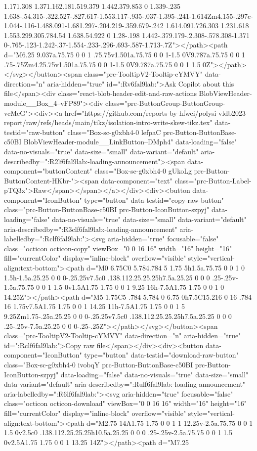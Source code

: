 {{{{{{{{{{{{{{{{{{{{{{{{{{{{{1.171.308 1.371.162.181.519.379 1.442.379.853 0 1.339-.235 1.638-.54.315-.322.527-.827.617-1.553.117-.935-.037-1.395-.241-1.614Zm4.155-.297c-1.044-.116-1.488.091-1.681.297-.204.219-.359.679-.242 1.614.091.726.303 1.231.618 1.553.299.305.784.54 1.638.54.922 0 1.28-.198 1.442-.379.179-.2.308-.578.308-1.371 0-.765-.123-1.242-.37-1.554-.233-.296-.693-.587-1.713-.7Z"></path><path d="M6.25 9.037a.75.75 0 0 1 .75.75v1.501a.75.75 0 0 1-1.5 0V9.787a.75.75 0 0 1 .75-.75Zm4.25.75v1.501a.75.75 0 0 1-1.5 0V9.787a.75.75 0 0 1 1.5 0Z"></path></svg></button><span class="prc-TooltipV2-Tooltip-cYMVY" data-direction="n" aria-hidden="true" id=":Rv6fal9lab:">Ask Copilot about this file</span><div class="react-blob-header-edit-and-raw-actions BlobViewHeader-module__Box_4--vFP89"><div class="prc-ButtonGroup-ButtonGroup-vcMeG"><div><a href="https://github.com/reports-by-hfwei/polysi-vldb2023-report/raw/refs/heads/main/tikz/isolation-intro-write-skew-tikz.tex" data-testid="raw-button" class="Box-sc-g0xbh4-0 lefpaC prc-Button-ButtonBase-c50BI BlobViewHeader-module__LinkButton--DMph4" data-loading="false" data-no-visuals="true" data-size="small" data-variant="default" aria-describedby=":R2lf6fal9lab:-loading-announcement"><span data-component="buttonContent" class="Box-sc-g0xbh4-0 gUkoLg prc-Button-ButtonContent-HKbr-"><span data-component="text" class="prc-Button-Label-pTQ3x">Raw</span></span></a></div><div><button data-component="IconButton" type="button" data-testid="copy-raw-button" class="prc-Button-ButtonBase-c50BI prc-Button-IconButton-szpyj" data-loading="false" data-no-visuals="true" data-size="small" data-variant="default" aria-describedby=":R3clf6fal9lab:-loading-announcement" aria-labelledby=":Rclf6fal9lab:"><svg aria-hidden="true" focusable="false" class="octicon octicon-copy" viewBox="0 0 16 16" width="16" height="16" fill="currentColor" display="inline-block" overflow="visible" style="vertical-align:text-bottom"><path d="M0 6.75C0 5.784.784 5 1.75 5h1.5a.75.75 0 0 1 0 1.5h-1.5a.25.25 0 0 0-.25.25v7.5c0 .138.112.25.25.25h7.5a.25.25 0 0 0 .25-.25v-1.5a.75.75 0 0 1 1.5 0v1.5A1.75 1.75 0 0 1 9.25 16h-7.5A1.75 1.75 0 0 1 0 14.25Z"></path><path d="M5 1.75C5 .784 5.784 0 6.75 0h7.5C15.216 0 16 .784 16 1.75v7.5A1.75 1.75 0 0 1 14.25 11h-7.5A1.75 1.75 0 0 1 5 9.25Zm1.75-.25a.25.25 0 0 0-.25.25v7.5c0 .138.112.25.25.25h7.5a.25.25 0 0 0 .25-.25v-7.5a.25.25 0 0 0-.25-.25Z"></path></svg></button><span class="prc-TooltipV2-Tooltip-cYMVY" data-direction="n" aria-hidden="true" id=":Rclf6fal9lab:">Copy raw file</span></div><div><button data-component="IconButton" type="button" data-testid="download-raw-button" class="Box-sc-g0xbh4-0 ivobqY prc-Button-ButtonBase-c50BI prc-Button-IconButton-szpyj" data-loading="false" data-no-visuals="true" data-size="small" data-variant="default" aria-describedby=":Rulf6fal9lab:-loading-announcement" aria-labelledby=":R6lf6fal9lab:"><svg aria-hidden="true" focusable="false" class="octicon octicon-download" viewBox="0 0 16 16" width="16" height="16" fill="currentColor" display="inline-block" overflow="visible" style="vertical-align:text-bottom"><path d="M2.75 14A1.75 1.75 0 0 1 1 12.25v-2.5a.75.75 0 0 1 1.5 0v2.5c0 .138.112.25.25.25h10.5a.25.25 0 0 0 .25-.25v-2.5a.75.75 0 0 1 1.5 0v2.5A1.75 1.75 0 0 1 13.25 14Z"></path><path d="M7.25 }}}}}}}}}}}}}}}}}}}}}}}}}}}}}
